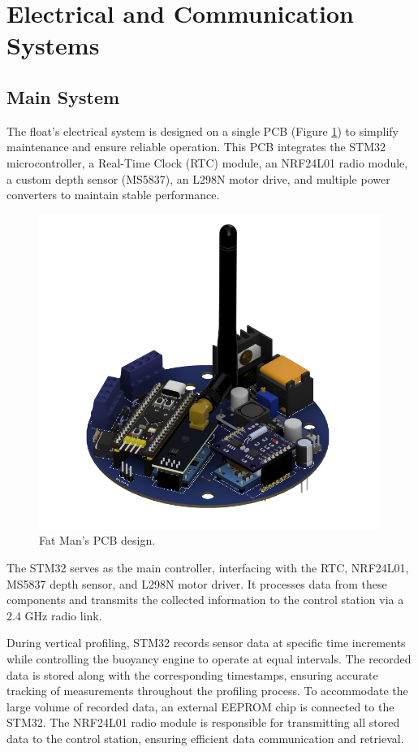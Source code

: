 \documentclass[11pt, twocolumn]{article}
\begin{document}
\section{Electrical and Communication Systems}
\subsection{Main System}

The float's electrical system is designed on a single PCB (Figure \ref{fig:pcb}) to simplify maintenance and ensure reliable operation. This PCB integrates the STM32 microcontroller, a Real-Time Clock (RTC) module, an NRF24L01 radio module, a custom depth sensor (MS5837), an L298N motor drive, and multiple power converters to maintain stable performance.

\begin{figure}[h]
  \centering
  \includegraphics[width=\columnwidth]{Images/pcb.png}
  \caption{Fat Man's PCB design.}
  \label{fig:pcb}
\end{figure}

\hspace{10pt} The STM32 serves as the main controller, interfacing with the RTC, NRF24L01, MS5837 depth sensor, and L298N motor driver. It processes data from these components and transmits the collected information to the control station via a 2.4 GHz radio link.

\hspace{10pt} During vertical profiling, STM32 records sensor data at specific time increments while controlling the buoyancy engine to operate at equal intervals. The recorded data is stored along with the corresponding timestamps, ensuring accurate tracking of measurements throughout the profiling process. To accommodate the large volume of recorded data, an external EEPROM chip is connected to the STM32. The NRF24L01 radio module is responsible for transmitting all stored data to the control station, ensuring efficient data communication and retrieval.
\end{document}
